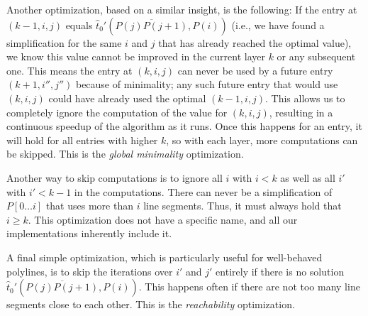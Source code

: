 Another optimization, based on a similar insight, is the following: If the entry at \((k-1, i, j)\) equals \(\hat t_0'(\overline{P(j)P(j+1)}, P(i))\) (i.e., we have found a simplification for the same \(i\) and \(j\) that has already reached the optimal value), we know this value cannot be improved in the current layer \(k\) or any subsequent one. This means the entry at \((k, i, j)\) can never be used by a future entry \((k + 1, i'', j'')\) because of minimality; any such future entry that would use \((k, i, j)\) could have already used the optimal \((k-1, i, j)\). This allows us to completely ignore the computation of the value for \((k, i, j)\), resulting in a continuous speedup of the algorithm as it runs. Once this happens for an entry, it will hold for all entries with higher \(k\), so with each layer, more computations can be skipped. This is the \emph{global minimality} optimization.

Another way to skip computations is to ignore all \(i\) with \(i < k\) as well as all \(i'\) with \(i' < k - 1\) in the computations. There can never be a simplification of \(P[0\dots i]\) that uses more than \(i\) line segments. Thus, it must always hold that \(i \geq k\). This optimization does not have a specific name, and all our implementations inherently include it.

A final simple optimization, which is particularly useful for well-behaved polylines, is to skip the iterations over \(i'\) and \(j'\) entirely if there is no solution \(\hat t_0'(\overline{P(j)P(j+1)}, P(i))\). This happens often if there are not too many line segments close to each other. This is the \emph{reachability} optimization.
